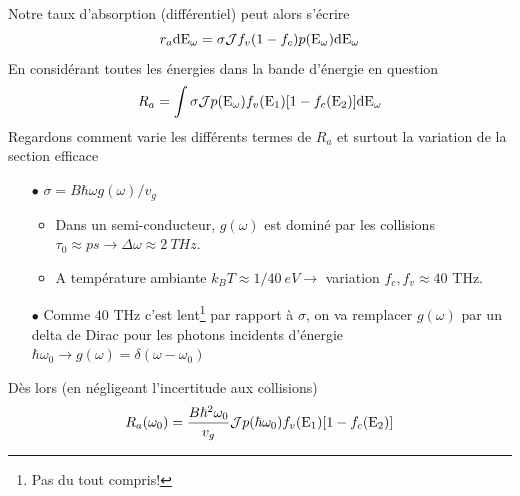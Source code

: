 		\ \\
		
		Notre taux d'absorption (différentiel) peut alors s'écrire
		\begin{equation}
		{r_a}{\rm{d}}{{\rm{E}}_\omega } = \sigma {{\cal J}}{f_v}(1 - {f_c})p({{\rm{E}}_\omega })
		{\rm{d}}{{\rm{E}}_\omega }
		\end{equation}
		En considérant toutes les énergies dans la bande d'énergie en question
		\begin{equation}
		{R_a} = \int {\sigma {{\cal J}}p({{\rm{E}}_\omega }){f_v}({{\rm{E}}_1})[1 - {f_c}
		({{\rm{E}}_{\rm{2}}})]{\rm{d}}{{\rm{E}}_\omega }} 
		\end{equation}
		Regardons comment varie les différents termes de $R_a$ et surtout la variation de la section
		efficace
		\begin{itemize}
		\item[$\bullet$] $\sigma  = B\hbar \omega g(\omega )/{v_g}$
		\begin{itemize}
		\item Dans un semi-conducteur, $g(\omega)$ est dominé par les collisions $\tau_0 \approx 
		ps\to\Delta\omega \approx 2\ THz$.
		\item A température ambiante $k_BT\approx1/40\ eV \to$ variation $f_c,f_v\approx 40$ THz.
		\end{itemize}
		\item[$\bullet$] Comme $40$ THz c'est lent\footnote{Pas du tout compris!} par rapport à 
		$\sigma$, on va remplacer $g(\omega)$ par un delta de Dirac pour les photons incidents
		d'énergie $\hbar\omega_0 \to g(\omega) = \delta(\omega-\omega_0)$
		\end{itemize}
		Dès lors (en négligeant l'incertitude aux collisions)
		\begin{equation}
		{R_a}({\omega _0}) = \frac{{B{\hbar ^2}{\omega _0}}}{{{v_g}}}{{\cal J}}p(\hbar {\omega
		 _0}){f_v}({{\rm{E}}_1})[1 - {f_c}({{\rm{E}}_{\rm{2}}})]
		\end{equation}
		
